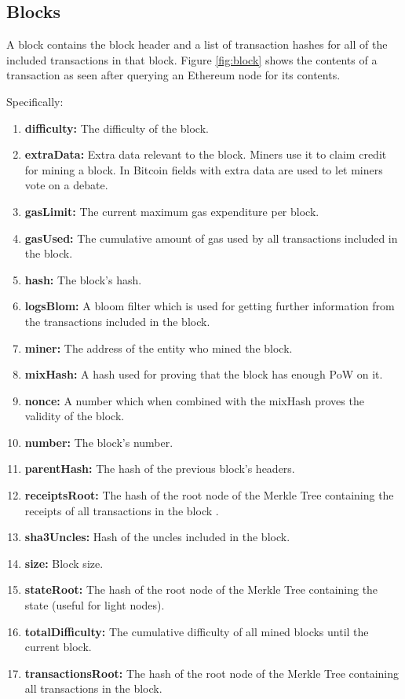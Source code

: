 \subsection{Blocks} \label{block}
A block contains the block header and a list of transaction hashes for all of the included transactions in that block. Figure \ref{fig:block} shows the contents of a transaction as seen after querying an Ethereum node for its contents.

Specifically:
\begin{enumerate}
    \item \textbf{difficulty:} The difficulty of the block.
    \item \textbf{extraData:} Extra data relevant to the block. Miners use it to claim credit for mining a block. In Bitcoin fields with extra data are used to let miners vote on a debate.
    \item \textbf{gasLimit:} The current maximum gas expenditure per block.
    \item \textbf{gasUsed:} The cumulative amount of gas used by all transactions included in the block.
    \item \textbf{hash:} The block's hash.
    \item \textbf{logsBlom:} A bloom filter which is used for getting further information from the transactions included in the block.
    \item \textbf{miner:} The address of the entity who mined the block.
    \item \textbf{mixHash:} A hash used for proving that the block has enough PoW on it.
    \item \textbf{nonce:} A number which when combined with the mixHash proves the validity of the block.
    \item \textbf{number:} The block's number.
    \item \textbf{parentHash:} The hash of the previous block's headers.
    \item \textbf{receiptsRoot:} The hash of the root node of the Merkle Tree containing the receipts of all transactions in the block .
    \item \textbf{sha3Uncles:} Hash of the uncles included in the block.
    \item \textbf{size:} Block size.
    \item \textbf{stateRoot:} The hash of the root node of the Merkle Tree containing the state (useful for light nodes).
    \item \textbf{totalDifficulty:} The cumulative difficulty of all mined blocks until the current block.
    \item \textbf{transactionsRoot:} The hash of the root node of the Merkle Tree containing all transactions in the block. 
\end{enumerate}

